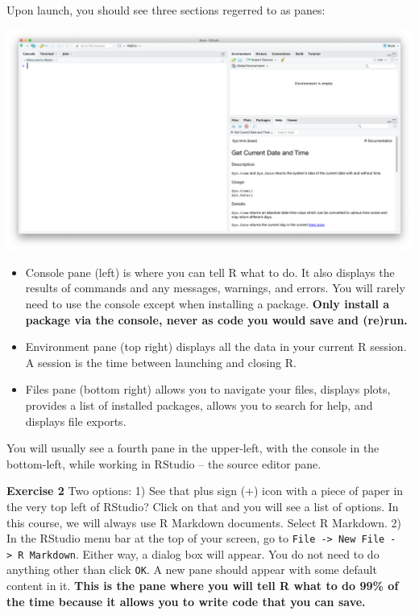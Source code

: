 \documentclass[
]{book}
\providecommand{\tightlist}{%
  \setlength{\itemsep}{0pt}\setlength{\parskip}{0pt}}
\newenvironment{rmdblock}[1]
  {\begin{shaded*}
  }
  {\end{shaded*}
  }
\newenvironment{learncheck}
  {\begin{rmdblock}{warning}}
  {\end{rmdblock}}
\begin{document}
Upon launch, you should see three sections regerred to as panes:

\begin{center}\includegraphics[width=\textwidth]{images/rstudio_sshot} \end{center}

\begin{itemize}
\tightlist
\item
  Console pane (left) is where you can tell R what to do. It also displays the results of commands and any messages, warnings, and errors. You will rarely need to use the console except when installing a package. \textbf{Only install a package via the console, never as code you would save and (re)run.}
\item
  Environment pane (top right) displays all the data in your current R session. A session is the time between launching and closing R.
\item
  Files pane (bottom right) allows you to navigate your files, displays plots, provides a list of installed packages, allows you to search for help, and displays file exports.
\end{itemize}

You will usually see a fourth pane in the upper-left, with the console in the bottom-left, while working in RStudio -- the source editor pane.

\begin{learncheck}
\textbf{Exercise 2} Two options: 1) See that plus sign (+) icon with a
piece of paper in the very top left of RStudio? Click on that and you
will see a list of options. In this course, we will always use R
Markdown documents. Select R Markdown. 2) In the RStudio menu bar at the
top of your screen, go to
\texttt{File\ -\textgreater{}\ New\ File\ -\textgreater{}\ R\ Markdown}.
Either way, a dialog box will appear. You do not need to do anything
other than click \texttt{OK}. A new pane should appear with some default
content in it. \textbf{This is the pane where you will tell R what to do
99\% of the time because it allows you to write code that you can save.}
\end{learncheck}
\end{document}
